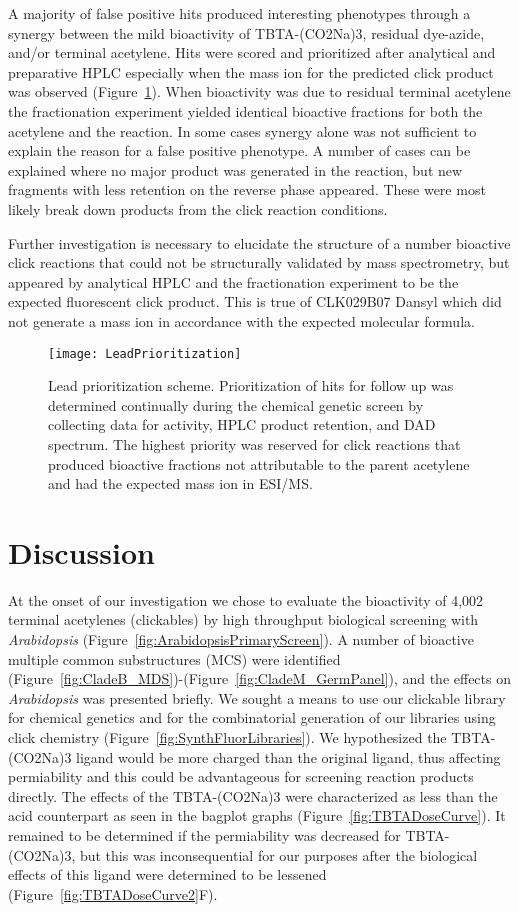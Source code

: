 A majority of false positive hits produced interesting phenotypes through a synergy between the mild bioactivity of TBTA-(CO2Na)3, residual dye-azide, and/or terminal acetylene. Hits were scored and prioritized after analytical and preparative HPLC especially when the mass ion for the predicted click product was observed (Figure~\ref{fig:LeadPrioritization}). When bioactivity was due to residual terminal acetylene the fractionation experiment yielded identical bioactive fractions for both the acetylene and the reaction. In some cases synergy alone was not sufficient to explain the reason for a false positive phenotype. A number of cases can be explained where no major product was generated in the reaction, but new fragments with less retention on the reverse phase appeared. These were most likely break down products from the click reaction conditions.

Further investigation is necessary to elucidate the structure of a number bioactive click reactions that could not be structurally validated by mass spectrometry, but appeared by analytical HPLC and the fractionation experiment to be the expected fluorescent click product. This is true of CLK029B07 Dansyl which did not generate a mass ion in accordance with the expected molecular formula. 


\begin{figure}
\texttt{[image: LeadPrioritization]}
\caption{Lead prioritization scheme. Prioritization of hits for follow up was determined continually during the chemical genetic screen by collecting data for activity, HPLC product retention, and DAD spectrum. The highest priority was reserved for click reactions that produced bioactive fractions not attributable to the parent acetylene and had the expected mass ion in ESI/MS.}
\label{fig:LeadPrioritization}
\end{figure}

\section{Discussion}

At the onset of our investigation we chose to evaluate the bioactivity of 4,002 terminal acetylenes (clickables) by high throughput biological screening with {\it Arabidopsis} (Figure~\ref{fig:ArabidopsisPrimaryScreen}). A number of bioactive multiple common substructures (MCS) were identified (Figure~\ref{fig:CladeB_MDS})-(Figure~\ref{fig:CladeM_GermPanel}), and the effects on {\it Arabidopsis} was presented briefly. We sought a means to use our clickable library for chemical genetics and for the combinatorial generation of our libraries using click chemistry (Figure~\ref{fig:SynthFluorLibraries}). We hypothesized the TBTA-(CO2Na)3 ligand would be more charged than the original ligand, thus affecting permiability and this could be advantageous for screening reaction products directly. The effects of the TBTA-(CO2Na)3 were characterized as less than the acid counterpart as seen in the bagplot graphs (Figure~\ref{fig:TBTADoseCurve}). It remained to be determined if the permiability was decreased for TBTA-(CO2Na)3, but this was inconsequential for our purposes after the biological effects of this ligand were determined to be lessened (Figure~\ref{fig:TBTADoseCurve2}F).

